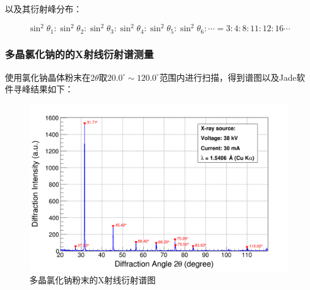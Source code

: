 \documentclass{thuemp}
\begin{document}
以及其衍射峰分布：

\begin{equation}
    \sin^2\theta_1 : \sin^2\theta_2: \sin^2\theta_3 : \sin^2\theta_4 : \sin^2\theta_5 : \sin^2\theta_6 : \cdots =
    3 : 4 : 8 : 11 : 12: 16 \cdots
    \label{eq:nacl_diff_patt}
\end{equation}

\subsubsection{多晶氯化钠的的X射线衍射谱测量}

使用氯化钠晶体粉末在$2\theta$取$20.0^\circ \sim 120.0^\circ$范围内进行扫描，得到谱图以及Jade软件寻峰结果如下：  

\begin{figure}[H]
    \centering
    \includegraphics[width=0.8\linewidth]{../Data/NaCl-multi.png}
    \caption{多晶氯化钠粉末的X射线衍射谱图}
    \label{fig:nacl_xrd_multi}
\end{figure}
\end{document}
